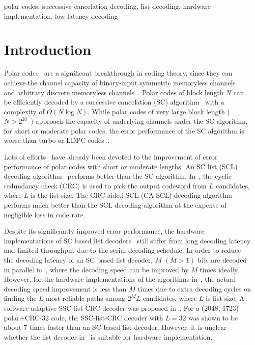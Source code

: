 \documentclass[journal]{IEEEtran}
\begin{document}
\begin{keywords}
polar codes, successive cancelation decoding, list decoding, hardware implementation, low latency decoding
\end{keywords}

\section{Introduction}
\label{sec:intro}

Polar codes~\cite{arikan} are a significant breakthrough in coding theory, since they can achieve the channel capacity of binary-input symmetric memoryless channels~\cite{arikan} and arbitrary discrete memoryless channels~\cite{sas_polar}. Polar codes of block length $N$ can be efficiently decoded by a successive cancelation (SC) algorithm~\cite{arikan} with a complexity of $O(N\log N)$. While polar codes of very large block length ($N>2^{20}$~\cite{gross_polar1}) approach the capacity of underlying channels under the SC algorithm, for short or moderate polar codes, the error performance of the SC algorithm is worse than turbo or LDPC codes~\cite{ido_it}.

Lots of efforts~\cite{ido_it, list2, list3} have already been devoted to the improvement of error performance of polar codes with short or moderate lengths. An SC list (SCL) decoding algorithm~\cite{ido_it} performs better than the SC algorithm. In~\cite{ido_it,list2, list3}, the cyclic redundancy check (CRC) is used to pick the output codeword from $L$ candidates, where $L$ is the list size. The CRC-aided SCL (CA-SCL) decoding algorithm performs much better than the SCL decoding algorithm at the expense of negligible loss in code rate.


Despite its significantly improved error performance, the hardware implementations of SC based list decoders~\cite{tree_list_dec, jun_low_mem_list, yuan_llr, llr_list_tsp, llr_list} still suffer from long decoding latency and limited throughput due to the serial decoding schedule.
In order to reduce the decoding latency of an SC based list decoder, $M$  $(M >1)$ bits are decoded in parallel in~\cite{bin_polar, yuan_low_latency, chenrong_tsp}, where the decoding speed can be improved by $M$ times ideally. However, for the hardware implementations of the algorithms in~\cite{bin_polar, yuan_low_latency, chenrong_tsp}, the actual decoding speed improvement is less than $M$ times due to extra decoding cycles on finding the $L$ most reliable paths among $2^ML$ candidates, where $L$ is list size.
A software adaptive SSC-list-CRC decoder was proposed in~\cite{gabi_low_latency}. For a (2048, 1723) polar+CRC-32 code, the SSC-list-CRC decoder with $L=32$ was shown to be about 7 times faster than an SC based list decoder. However, it is unclear whether the list decoder in~\cite{gabi_low_latency} is suitable for hardware implementation.
\end{document}
